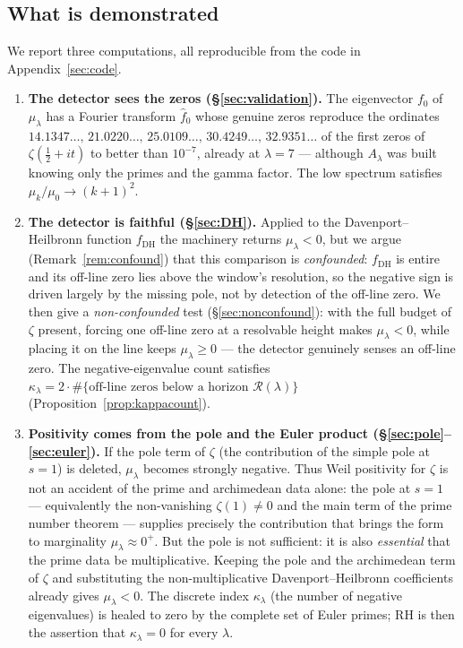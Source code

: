 \documentclass[11pt]{amsart}
\theoremstyle{definition}
\theoremstyle{remark}
\newcommand{\lam}{\lambda}
\begin{document}
\subsection*{What is demonstrated}
We report three computations, all reproducible from the code in Appendix~\ref{sec:code}.

\begin{enumerate}[label=(\Roman*),leftmargin=*]
\item \textbf{The detector sees the zeros (\S\ref{sec:validation}).} The eigenvector $f_0$ of $\mu_\lam$ has a Fourier transform $\widehat f_0$ whose genuine zeros reproduce the ordinates $14.1347\ldots,\,21.0220\ldots,\,25.0109\ldots,\,30.4249\ldots,\,32.9351\ldots$ of the first zeros of $\zeta(\tfrac12+it)$ to better than $10^{-7}$, already at $\lam=7$ --- although $A_\lam$ was built knowing only the primes and the gamma factor. The low spectrum satisfies $\mu_k/\mu_0\to (k+1)^2$.
\item \textbf{The detector is faithful (\S\ref{sec:DH}).} Applied to the Davenport--Heilbronn function $f_{\mathrm{DH}}$ the machinery returns $\mu_\lam<0$, but we argue (Remark~\ref{rem:confound}) that this comparison is \emph{confounded}: $f_{\mathrm{DH}}$ is entire and its off-line zero lies above the window's resolution, so the negative sign is driven largely by the missing pole, not by detection of the off-line zero. We then give a \emph{non-confounded} test (\S\ref{sec:nonconfound}): with the full budget of $\zeta$ present, forcing one off-line zero at a resolvable height makes $\mu_\lam<0$, while placing it on the line keeps $\mu_\lam\ge0$ --- the detector genuinely senses an off-line zero. The negative-eigenvalue count satisfies $\kappa_\lam=2\cdot\#\{\text{off-line zeros below a horizon }\mathcal R(\lam)\}$ (Proposition~\ref{prop:kappacount}).
\item \textbf{Positivity comes from the pole and the Euler product (\S\ref{sec:pole}--\ref{sec:euler}).} If the pole term of $\zeta$ (the contribution of the simple pole at $s=1$) is deleted, $\mu_\lam$ becomes strongly negative. Thus Weil positivity for $\zeta$ is not an accident of the prime and archimedean data alone: the pole at $s=1$ --- equivalently the non-vanishing $\zeta(1)\ne 0$ and the main term of the prime number theorem --- supplies precisely the contribution that brings the form to marginality $\mu_\lam\approx 0^+$. But the pole is not sufficient: it is also \emph{essential} that the prime data be multiplicative. Keeping the pole and the archimedean term of $\zeta$ and substituting the non-multiplicative Davenport--Heilbronn coefficients already gives $\mu_\lam<0$. The discrete index $\kappa_\lam$ (the number of negative eigenvalues) is healed to zero by the complete set of Euler primes; RH is then the assertion that $\kappa_\lam=0$ for every $\lam$.
\end{enumerate}
\end{document}
